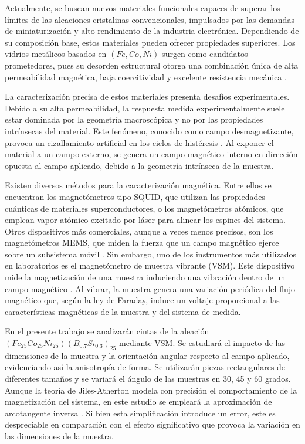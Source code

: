 Actualmente, se buscan nuevos materiales funcionales capaces de superar los límites de las aleaciones cristalinas convencionales, impulsados por las demandas de miniaturización y alto rendimiento de la industria electrónica. Dependiendo de su composición base, estos materiales pueden ofrecer propiedades superiores. Los vidrios metálicos basados en $(Fe,Co,Ni)$ surgen como candidatos prometedores, pues su desorden estructural otorga una combinación única de alta permeabilidad magnética, baja coercitividad y excelente resistencia mecánica \cite{panahi2022structure}.

La caracterización precisa de estos materiales presenta desafíos experimentales. Debido a su alta permeabilidad, la respuesta medida experimentalmente suele estar dominada por la geometría macroscópica y no por las propiedades intrínsecas del material. Este fenómeno, conocido como campo desmagnetizante, provoca un cizallamiento artificial en los ciclos de histéresis \cite{cullity2009introduction}. Al exponer el material a un campo externo, se genera un campo magnético interno en dirección opuesta al campo aplicado, debido a la geometría intrínseca de la muestra.

Existen diversos métodos para la caracterización magnética. Entre ellos se encuentran los magnetómetros tipo SQUID, que utilizan las propiedades cuánticas de materiales superconductores, o los magnetómetros atómicos, que emplean vapor atómico excitado por láser para alinear los espines del sistema. Otros dispositivos más comerciales, aunque a veces menos precisos, son los magnetómetros MEMS, que miden la fuerza que un campo magnético ejerce sobre un subsistema móvil \cite{ScienceDirectMagnetometer}. Sin embargo, uno de los instrumentos más utilizados en laboratorios es el magnetómetro de muestra vibrante (VSM). Este dispositivo mide la magnetización de una muestra induciendo una vibración dentro de un campo magnético \cite{Buchner2018}. Al vibrar, la muestra genera una variación periódica del flujo magnético que, según la ley de Faraday, induce un voltaje proporcional a las características magnéticas de la muestra y del sistema de medida.

En el presente trabajo se analizarán cintas de la aleación $(Fe_{25}Co_{25}Ni_{25})(B_{0.7}Si_{0.3})_{25}$ mediante VSM. Se estudiará el impacto de las dimensiones de la muestra y la orientación angular respecto al campo aplicado, evidenciando así la anisotropía de forma. Se utilizarán piezas rectangulares de diferentes tamaños y se variará el ángulo de las muestras en 30, 45 y 60 grados. Aunque la teoría de Jiles-Atherton modela con precisión el comportamiento de la magnetización del sistema, en este estudio se empleará la aproximación de arcotangente inversa \cite{Wilson2002}. Si bien esta simplificación introduce un error, este es despreciable en comparación con el efecto significativo que provoca la variación en las dimensiones de la muestra.








